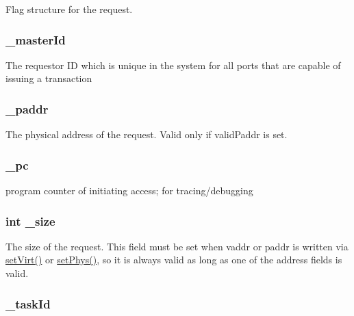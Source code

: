 \label{classRequest_af06d77fa987a3b16cc23de9ac834c43d}
Flag structure for the request. \hypertarget{classRequest_a23e4e74239f2919fd2f05d672fbf7cb7}{
\subsubsection[{\_\-masterId}]{ {\bf \_\-masterId}}}
\label{classRequest_a23e4e74239f2919fd2f05d672fbf7cb7}
The requestor ID which is unique in the system for all ports that are capable of issuing a transaction \hypertarget{classRequest_af988966e1853653146cc5161488cdd6a}{
\subsubsection[{\_\-paddr}]{ {\bf \_\-paddr}}}
\label{classRequest_af988966e1853653146cc5161488cdd6a}
The physical address of the request. Valid only if validPaddr is set. \hypertarget{classRequest_aca8c2d126b6fd936bb5c48007248beed}{
\subsubsection[{\_\-pc}]{ {\bf \_\-pc}}}
\label{classRequest_aca8c2d126b6fd936bb5c48007248beed}
program counter of initiating access; for tracing/debugging \hypertarget{classRequest_aaa6c8c862a2c0bc18c802314cc58961d}{
\subsubsection[{\_\-size}]{\setlength{\rightskip}{0pt plus 5cm}int {\bf \_\-size}}}
\label{classRequest_aaa6c8c862a2c0bc18c802314cc58961d}
The size of the request. This field must be set when vaddr or paddr is written via \hyperlink{classRequest_a63cbf386080363fe7c7b364bb2fe3b3e}{setVirt()} or \hyperlink{classRequest_aeefca2329f8f252cd5c17463dc7f8fda}{setPhys()}, so it is always valid as long as one of the address fields is valid. \hypertarget{classRequest_a26b7e95ff0ac1179f5e53088c59a24bb}{
\subsubsection[{\_\-taskId}]{ {\bf \_\-taskId}}}
